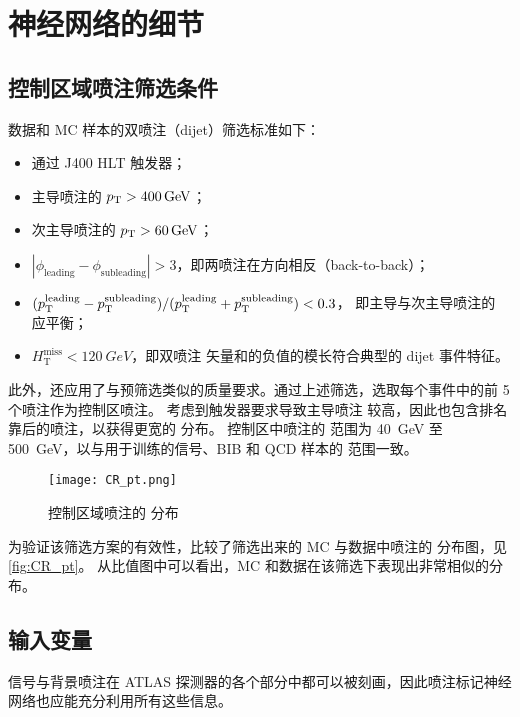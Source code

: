 \chapter{神经网络的细节}

\section{控制区域喷注筛选条件}
\label{cpm:CR_jet_selection}

数据和 MC 样本的双喷注（dijet）筛选标准如下：
\begin{itemize}
      \item 通过 J400 HLT 触发器；
      \item 主导喷注的 $p_{\text{T}} > \SI{400}{GeV}$；
      \item 次主导喷注的 $p_{\text{T}} > \SI{60}{GeV}$；
      \item $|\phi_{\text{leading}} - \phi_{\text{subleading}}| > 3$，即两喷注在方向相反（back-to-back）；
      \item $(p_{\text{T}}^{\text{leading}} - p_{\text{T}}^{\text{subleading}}) / (p_{\text{T}}^{\text{leading}} + p_{\text{T}}^{\text{subleading}}) < 0.3$，
            即主导与次主导喷注的 \pt 应平衡；
      \item $H_\text{T}^\text{miss} < \SI{120}{GeV}$，即双喷注 \pt 矢量和的负值的模长符合典型的 dijet 事件特征。
\end{itemize}

此外，还应用了与预筛选类似的质量要求。通过上述筛选，选取每个事件中的前 5 个喷注作为控制区喷注。
考虑到触发器要求导致主导喷注 \pt 较高，因此也包含排名靠后的喷注，以获得更宽的 \pt 分布。
控制区中喷注的 \pt 范围为 \SI{40}{GeV} 至 \SI{500}{GeV}，以与用于训练的信号、BIB 和 QCD 样本的 \pt 范围一致。

\begin{figure}[ht]
      \centering
      \texttt{[image: CR\_pt.png]}
      \caption{控制区域喷注的 \pt 分布}
      \label{fig:CR_pt}
\end{figure}

为验证该筛选方案的有效性，比较了筛选出来的 MC 与数据中喷注的 \pt 分布图，见\autoref{fig:CR_pt}。
从比值图中可以看出，MC 和数据在该筛选下表现出非常相似的分布。


\section{输入变量}
\label{cpm:NN_variables}

信号与背景喷注在 ATLAS 探测器的各个部分中都可以被刻画，因此喷注标记神经网络也应能充分利用所有这些信息。

